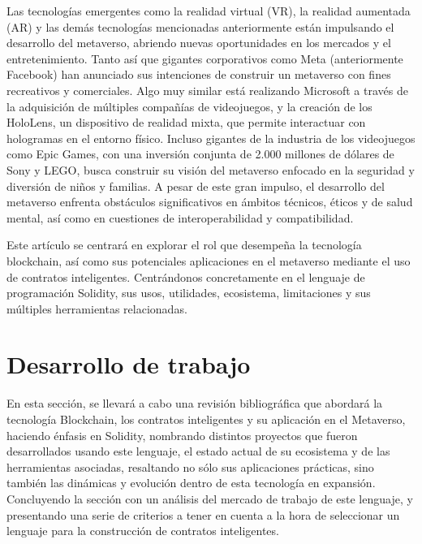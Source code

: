 \documentclass[a4paper,10pt]{article}
\begin{document}
	Las tecnologías emergentes como la realidad virtual (VR), la realidad aumentada (AR) y las demás tecnologías mencionadas anteriormente están impulsando el desarrollo del metaverso, abriendo nuevas oportunidades en los mercados y el entretenimiento. Tanto así que gigantes corporativos como Meta (anteriormente Facebook) han anunciado sus intenciones de construir un metaverso con fines recreativos y comerciales. Algo muy similar está realizando Microsoft a través de la adquisición de múltiples compañías de videojuegos, y la creación de los HoloLens, un dispositivo de realidad mixta, que permite interactuar con hologramas en el entorno físico. Incluso gigantes de la industria de los videojuegos como Epic Games, con una inversión conjunta de 2.000 millones de dólares de Sony y LEGO, busca construir su visión del metaverso enfocado en la seguridad y diversión de niños y familias. A pesar de este gran impulso, el desarrollo del metaverso enfrenta obstáculos significativos en ámbitos técnicos, éticos y de salud mental, así como en cuestiones de interoperabilidad y compatibilidad. 
	
	Este artículo se centrará en explorar el rol que desempeña la tecnología blockchain, así como sus potenciales aplicaciones en el metaverso mediante el uso de contratos inteligentes. Centrándonos concretamente en el lenguaje de programación Solidity, sus usos, utilidades, ecosistema, limitaciones y sus múltiples herramientas relacionadas.
	\section{Desarrollo de trabajo}
	En esta sección, se llevará a cabo una revisión bibliográfica que abordará la tecnología Blockchain, los contratos inteligentes y su aplicación en el Metaverso, haciendo énfasis en Solidity, nombrando distintos proyectos que fueron desarrollados usando este lenguaje, el estado actual de su ecosistema y de las herramientas asociadas, resaltando no sólo sus aplicaciones prácticas, sino también las dinámicas y evolución dentro de esta tecnología en expansión. Concluyendo la sección con un análisis del mercado de trabajo de este lenguaje, y presentando una serie de criterios a tener en cuenta a la hora de seleccionar un lenguaje para la construcción de contratos inteligentes.
	
\end{document}
